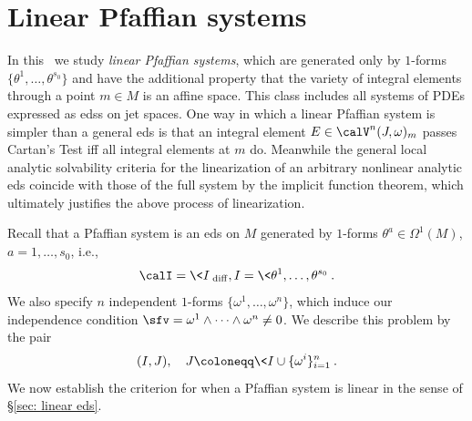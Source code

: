 \section{Linear Pfaffian systems}\label{sec: lin Pfaffian systems}


In this \sect\ we study \emph{linear Pfaffian systems}, which are generated only by $1$-forms $\{\theta^1,\ldots,\theta^{s_0}\}$ and have the additional property that the variety of integral elements through a point $m\in M$ is an affine space. This class includes all systems of PDEs expressed as \glspl{eds} on jet spaces. One way in which a linear Pfaffian system is simpler than a general \gls{eds} is that an integral element $E\in\calV^n(J,\omega)_m$ passes Cartan's Test iff all integral elements at $m$ do. Meanwhile the general local analytic solvability criteria for the linearization of an arbitrary  nonlinear analytic \gls{eds} coincide with those of the full system by the implicit function theorem, which ultimately justifies the above process of linearization.

Recall that a Pfaffian system is an \gls{eds} on $M$ generated by $1$-forms $\theta^a\in \Omega^1(M)$, $a=1,\ldots,s_0$, i.e., 
\[\calI=\<I\>_{\mathrm{diff}}, I=\<\theta^1,\ldots,\theta^{s_0}\>.\]
We also specify $n$ independent $1$-forms $\{\omega^1,\ldots,\omega^n\}$,  which induce our independence condition $\sfv=\omega^1\wedge\cdots\wedge\omega^n\neq 0$. We describe this problem by the pair 
\[(I,J),\quad J\coloneqq \<I\cup\{\omega^i\}_{i=1}^n\>.\]
We now establish the criterion for when a Pfaffian system is linear in the sense of \S\ref{sec: linear eds}.

